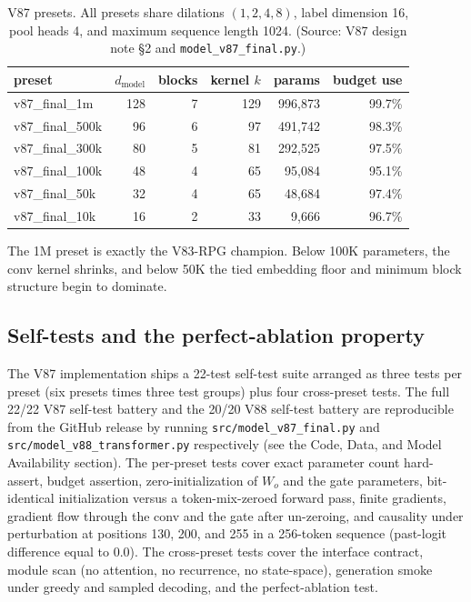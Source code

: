 \documentclass[11pt]{article}
\begin{document}
\begin{table}[!t]
\small
\caption{V87 presets. All presets share dilations $(1,2,4,8)$, label dimension 16, pool heads 4, and maximum sequence length 1024. (Source: V87 design note \S2 and \texttt{model\_v87\_final.py}.)}
\label{tab:v87-presets}
\centering
\begin{tabular}{lrrrrr}
\toprule
preset & $d_{\text{model}}$ & blocks & kernel $k$ & params & budget use \\
\midrule
v87\_final\_1m  & 128 & 7 & 129 & 996,873 & 99.7\% \\
v87\_final\_500k&  96 & 6 &  97 & 491,742 & 98.3\% \\
v87\_final\_300k&  80 & 5 &  81 & 292,525 & 97.5\% \\
v87\_final\_100k&  48 & 4 &  65 &  95,084 & 95.1\% \\
v87\_final\_50k &  32 & 4 &  65 &  48,684 & 97.4\% \\
v87\_final\_10k &  16 & 2 &  33 &   9,666 & 96.7\% \\
\bottomrule
\end{tabular}
\end{table}

The 1M preset is exactly the V83-RPG champion. Below 100K parameters, the conv kernel shrinks, and below 50K the tied embedding floor and minimum block structure begin to dominate.

\subsection{Self-tests and the perfect-ablation property}

The V87 implementation ships a 22-test self-test suite arranged as three tests per preset (six presets times three test groups) plus four cross-preset tests. The full 22/22 V87 self-test battery and the 20/20 V88 self-test battery are reproducible from the GitHub release by running \texttt{src/model\_v87\_final.py} and \texttt{src/model\_v88\_transformer.py} respectively (see the Code, Data, and Model Availability section). The per-preset tests cover exact parameter count hard-assert, budget assertion, zero-initialization of $W_o$ and the gate parameters, bit-identical initialization versus a token-mix-zeroed forward pass, finite gradients, gradient flow through the conv and the gate after un-zeroing, and causality under perturbation at positions 130, 200, and 255 in a 256-token sequence (past-logit difference equal to 0.0). The cross-preset tests cover the interface contract, module scan (no attention, no recurrence, no state-space), generation smoke under greedy and sampled decoding, and the perfect-ablation test.
\end{document}
